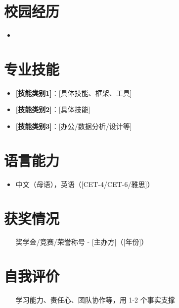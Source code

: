 \documentclass[11pt,a4paper,sans]{moderncv}
\begin{document}
\section{校园经历}
\vspace{1pt}
\begin{itemize}

\item{}

\end{itemize}

\section{专业技能}
\vspace{1pt}
\begin{itemize}
\item \textbf{[技能类别1]}：[具体技能、框架、工具]
\item \textbf{[技能类别2]}：[具体技能]
\item \textbf{[技能类别3]}：[办公/数据分析/设计等]
\end{itemize}

\section{语言能力}
\vspace{1pt}
\begin{itemize}
\item 中文（母语），英语（[CET-4/CET-6/雅思]）
\end{itemize}

\section{获奖情况}
\vspace{1pt}
\begin{itemize}
\item [奖学金/竞赛/荣誉称号] - [主办方]（[年份]）
\end{itemize}

\section{自我评价}
\vspace{1pt}
\begin{itemize}
\item [学习能力、责任心、团队协作等，用 1-2 个事实支撑]
\end{itemize}
\end{document}
